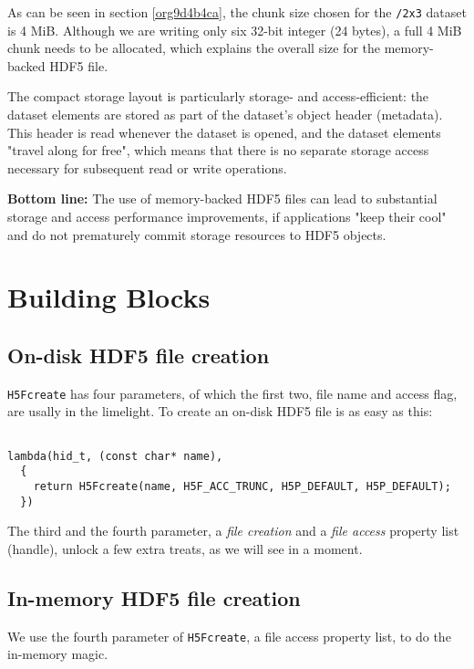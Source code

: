 \documentclass[a4paper, 12pt]{article}
\begin{document}
As can be seen in section \ref{org9d4b4ca}, the chunk size chosen
for the \texttt{/2x3} dataset is 4 MiB. Although we are writing only six 32-bit
integer (24 bytes), a full 4 MiB chunk needs to be allocated, which explains
the overall size for the memory-backed HDF5 file.

The compact storage layout is particularly storage- and access-efficient:
the dataset elements are stored as part of the dataset's object header
(metadata). This header is read whenever the dataset is opened, and the
dataset elements "travel along for free", which means that there is no
separate storage access necessary for subsequent read or write operations.

\textbf{\textbf{Bottom line:}} The use of memory-backed HDF5 files can lead to substantial
storage and access performance improvements, if applications "keep their
cool" and do not prematurely commit storage resources to HDF5 objects.

\section{Building Blocks \label{orga1e6e52}}
\label{sec:orgdd09289}

\subsection{On-disk HDF5 file creation \label{orgba3acb2}}
\label{sec:orgd389401}

\texttt{H5Fcreate} has four parameters, of which the first two, file name and access
flag, are usally in the limelight. To create an on-disk HDF5 file is as easy
as this:

\begin{verbatim}

lambda(hid_t, (const char* name),
  {
    return H5Fcreate(name, H5F_ACC_TRUNC, H5P_DEFAULT, H5P_DEFAULT);
  })

\end{verbatim}

The third and the fourth parameter, a \emph{file creation} and a \emph{file access}
property list (handle), unlock a few extra treats, as we will see in a
moment.

\subsection{In-memory HDF5 file creation \label{org6650a61}}
\label{sec:orgf848da4}

We use the fourth parameter of \texttt{H5Fcreate}, a file access property list, to do
the in-memory magic.
\end{document}
